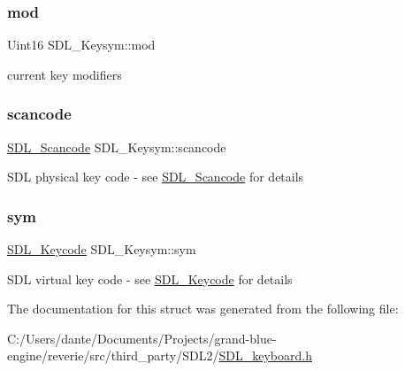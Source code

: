 \subsubsection{\texorpdfstring{mod}{mod}}
{\footnotesize\ttfamily Uint16 S\+D\+L\+\_\+\+Keysym\+::mod}

current key modifiers \mbox{\label{struct_s_d_l___keysym_ad47e9120a511e2efc7ec0c6d8a5ec51e}} 
\subsubsection{\texorpdfstring{scancode}{scancode}}
{\footnotesize\ttfamily \mbox{\hyperlink{_s_d_l__scancode_8h_a82ab7cff701034fb40a47b5b3a02777b}{S\+D\+L\+\_\+\+Scancode}} S\+D\+L\+\_\+\+Keysym\+::scancode}

S\+DL physical key code -\/ see \mbox{\hyperlink{_s_d_l__scancode_8h_a82ab7cff701034fb40a47b5b3a02777b}{S\+D\+L\+\_\+\+Scancode}} for details \mbox{\label{struct_s_d_l___keysym_a082ff1fd787b79fa6c3a445deb225f08}} 
\subsubsection{\texorpdfstring{sym}{sym}}
{\footnotesize\ttfamily \mbox{\hyperlink{_s_d_l__keycode_8h_ae9265f064f13f0f74dfca26a67875171}{S\+D\+L\+\_\+\+Keycode}} S\+D\+L\+\_\+\+Keysym\+::sym}

S\+DL virtual key code -\/ see \mbox{\hyperlink{_s_d_l__keycode_8h_ae9265f064f13f0f74dfca26a67875171}{S\+D\+L\+\_\+\+Keycode}} for details 

The documentation for this struct was generated from the following file\+:\begin{DoxyCompactItemize}
\item 
C\+:/\+Users/dante/\+Documents/\+Projects/grand-\/blue-\/engine/reverie/src/third\+\_\+party/\+S\+D\+L2/\mbox{\hyperlink{_s_d_l__keyboard_8h}{S\+D\+L\+\_\+keyboard.\+h}}\end{DoxyCompactItemize}
